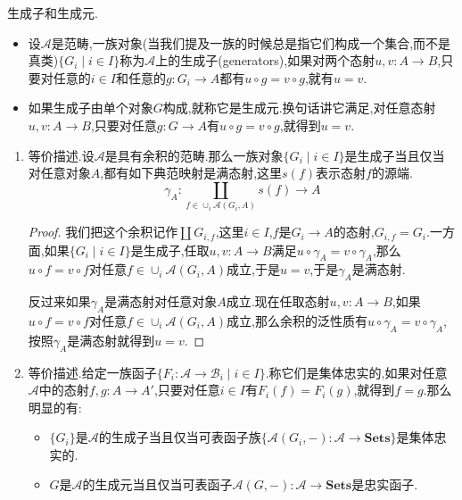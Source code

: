 生成子和生成元.
\begin{itemize}
	\item 设$\mathscr{A}$是范畴,一族对象(当我们提及一族的时候总是指它们构成一个集合,而不是真类)$\{G_i\mid i\in I\}$称为$\mathscr{A}$上的生成子(generators),如果对两个态射$u,v:A\to B$,只要对任意的$i\in I$和任意的$g:G_i\to A$都有$u\circ g=v\circ g$,就有$u=v$.
	\item 如果生成子由单个对象$G$构成,就称它是生成元.换句话讲它满足,对任意态射$u,v:A\to B$,只要对任意$g:G\to A$有$u\circ g=v\circ g$,就得到$u=v$.
\end{itemize}
\begin{enumerate}
	\item 等价描述.设$\mathscr{A}$是具有余积的范畴.那么一族对象$\{G_i\mid i\in I\}$是生成子当且仅当对任意对象$A$,都有如下典范映射是满态射,这里$s(f)$表示态射$f$的源端.
	$$\gamma_A:\coprod_{f\in\cup_i\mathscr{A}(G_i,A)}s(f)\to A$$
	\begin{proof}
		
		我们把这个余积记作$\coprod G_{i,f}$,这里$i\in I$,$f$是$G_i\to A$的态射,$G_{i,f}=G_i$.一方面,如果$\{G_i\mid i\in I\}$是生成子,任取$u,v:A\to B$满足$u\circ\gamma_A=v\circ\gamma_A$,那么$u\circ f=v\circ f$对任意$f\in\cup_i\mathscr{A}(G_i,A)$成立,于是$u=v$,于是$\gamma_A$是满态射.
		
		\qquad
		
		反过来如果$\gamma_A$是满态射对任意对象$A$成立.现在任取态射$u,v:A\to B$,如果$u\circ f=v\circ f$对任意$f\in\cup_i\mathscr{A}(G_i,A)$成立,那么余积的泛性质有$u\circ\gamma_A=v\circ\gamma_A$,按照$\gamma_A$是满态射就得到$u=v$.
	\end{proof}
    \item 等价描述.给定一族函子$\{F_i:\mathscr{A}\to\mathscr{B}_i\mid i\in I\}$.称它们是集体忠实的,如果对任意$\mathscr{A}$中的态射$f,g:A\to A'$,只要对任意$i\in I$有$F_i(f)=F_i(g)$,就得到$f=g$.那么明显的有:
    \begin{itemize}
    	\item $\{G_i\}$是$\mathscr{A}$的生成子当且仅当可表函子族$\{\mathscr{A}(G_i,-):\mathscr{A}\to\textbf{Sets}\}$是集体忠实的.
    	\item $G$是$\mathscr{A}$的生成元当且仅当可表函子$\mathscr{A}(G,-):\mathscr{A}\to\textbf{Sets}$是忠实函子.
    \end{itemize}
\end{enumerate}

